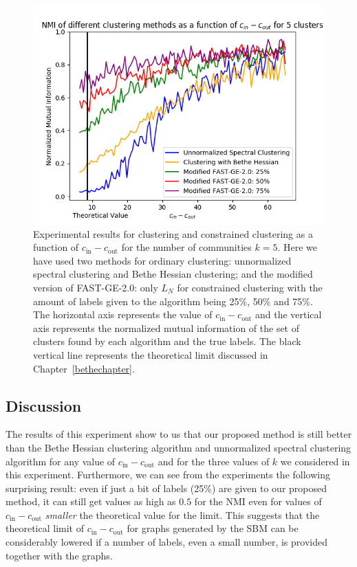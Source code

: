 \begin{figure}[h]
\begin{center}
\includegraphics[width=14cm]{figures/ACDV3.png}
\end{center}
   \caption[Experimental results for clustering and constrained clustering as a function of $c_\text{in} - c_\text{out}$ for the number of communities $k=5$]{Experimental results for clustering and constrained clustering as a function of $c_\text{in} - c_\text{out}$ for the number of communities $k=5$. Here we have used two methods for ordinary clustering: unnormalized spectral clustering and Bethe Hessian clustering; and the modified version of FAST-GE-2.0: only $L_N$ for constrained clustering with the amount of labels given to the algorithm being 25\%, 50\% and 75\%. The horizontal axis represents the value of $c_\text{in} - c_\text{out}$ and the vertical axis represents the normalized mutual information of the set of clusters found by each algorithm and the true labels. The black vertical line represents the theoretical limit discussed in Chapter~\ref{bethechapter}.}
   \label{ACDV3}
\end{figure}

\subsection*{Discussion}
The results of this experiment show to us that our proposed method is still better than the Bethe Hessian clustering algorithm and unnormalized spectral clustering algorithm for any value of $c_\text{in} - c_\text{out}$ and for the three values of $k$ we considered in this experiment.
Furthermore, we can see from the experiments the following surprising result: even if just a bit of labels (25\%) are given to our proposed method, it can still get values as high as $0.5$ for the NMI even for values of $c_\text{in} - c_\text{out}$ \textit{smaller} the theoretical value for the limit.
This suggests that the theoretical limit of $c_\text{in} - c_\text{out}$ for graphs generated by the SBM can be considerably lowered if a number of labels, even a small number, is provided together with the graphs.




